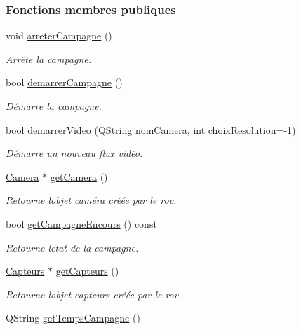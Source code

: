 \subsubsection*{Fonctions membres publiques}
\begin{DoxyCompactItemize}
\item 
void \hyperlink{class_rov_ad53e8d86817c81f92e3113b0394bedc5}{arreter\+Campagne} ()
\begin{DoxyCompactList}\small\item\em Arrête la campagne. \end{DoxyCompactList}\item 
bool \hyperlink{class_rov_ab20c6d0a73d6b20d4bef9e9236535a3d}{demarrer\+Campagne} ()
\begin{DoxyCompactList}\small\item\em Démarre la campagne. \end{DoxyCompactList}\item 
bool \hyperlink{class_rov_aaf1a53557b6e8f0ae2497a0af93bd6db}{demarrer\+Video} (Q\+String nom\+Camera, int choix\+Resolution=-\/1)
\begin{DoxyCompactList}\small\item\em Démarre un nouveau flux vidéo. \end{DoxyCompactList}\item 
\hyperlink{class_camera}{Camera} $\ast$ \hyperlink{class_rov_ac1eeb568d39018359b89384c2ee6ee86}{get\+Camera} ()
\begin{DoxyCompactList}\small\item\em Retourne l\textquotesingle{}objet caméra créée par le rov. \end{DoxyCompactList}\item 
bool \hyperlink{class_rov_a59d1a6d2ca83324e6efc0b74f2cff686}{get\+Campagne\+Encours} () const
\begin{DoxyCompactList}\small\item\em Retourne l\textquotesingle{}etat de la campagne. \end{DoxyCompactList}\item 
\hyperlink{class_capteurs}{Capteurs} $\ast$ \hyperlink{class_rov_a7e231245b39e7cc8026324e337b34c64}{get\+Capteurs} ()
\begin{DoxyCompactList}\small\item\em Retourne l\textquotesingle{}objet capteurs créée par le rov. \end{DoxyCompactList}\item 
Q\+String \hyperlink{class_rov_aa977585d4377a57281004fd57208635a}{get\+Temps\+Campagne} ()

\end{DoxyCompactItemize}

